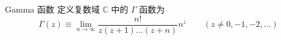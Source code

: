 
\begin{definition}{Gamma 函数}
定义复数域 $\mathbb C$ 中的 $\Gamma$ 函数为
\begin{equation}
\Gamma(z) \equiv \lim_{n\to\infty} \frac{n!}{z(z+1)\dots(z+n)}n^z \qquad (z \ne 0, -1, -2,\dots)
\end{equation}
\end{definition}

